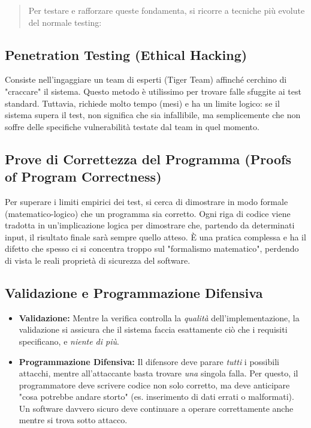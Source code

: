 \documentclass{article}
\begin{document}
\begin{quote}
    Per testare e rafforzare queste fondamenta, si ricorre a tecniche più evolute del normale testing:
\end{quote}

\subsection*{Penetration Testing (Ethical Hacking)}

Consiste nell'ingaggiare un team di esperti (Tiger Team) affinché cerchino di "craccare" il sistema. Questo metodo è utilissimo per trovare falle sfuggite ai test standard. Tuttavia, richiede molto tempo (mesi) e ha un limite logico: se il sistema supera il test, non significa che sia infallibile, ma semplicemente che non soffre delle specifiche vulnerabilità testate dal team in quel momento.

\subsection*{Prove di Correttezza del Programma (Proofs of Program Correctness)}

Per superare i limiti empirici dei test, si cerca di dimostrare in modo formale (matematico-logico) che un programma sia corretto. Ogni riga di codice viene tradotta in un'implicazione logica per dimostrare che, partendo da determinati input, il risultato finale sarà sempre quello atteso. È una pratica complessa e ha il difetto che spesso ci si concentra troppo sul "formalismo matematico", perdendo di vista le reali proprietà di sicurezza del software.

\subsection*{Validazione e Programmazione Difensiva}

\begin{itemize}
    \item \textbf{Validazione:} Mentre la verifica controlla la \textit{qualità} dell'implementazione, la validazione si assicura che il sistema faccia esattamente ciò che i requisiti specificano, e \textit{niente di più}.
    \item \textbf{Programmazione Difensiva:} Il difensore deve parare \textit{tutti} i possibili attacchi, mentre all'attaccante basta trovare \textit{una} singola falla. Per questo, il programmatore deve scrivere codice non solo corretto, ma deve anticipare "cosa potrebbe andare storto" (es. inserimento di dati errati o malformati). Un software davvero sicuro deve continuare a operare correttamente anche mentre si trova sotto attacco.
\end{itemize}
\end{document}
